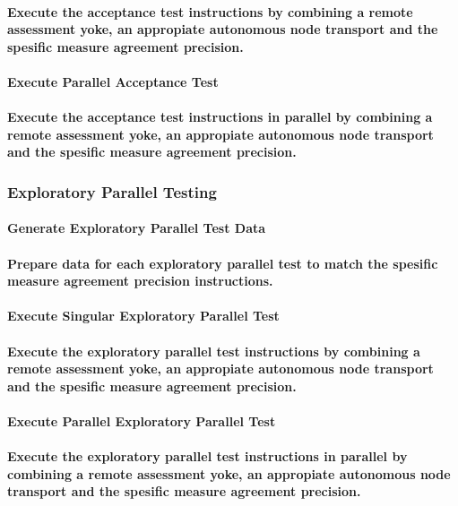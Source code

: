 \documentclass{acm_proc_article-sp}
\begin{document}
\paragraph{Execute the acceptance test instructions by combining a remote assessment yoke, an appropiate autonomous node transport and the spesific measure agreement precision.}
\paragraph{Execute Parallel Acceptance Test}
\paragraph{Execute the acceptance test instructions in parallel by combining a remote assessment yoke, an appropiate autonomous node transport and the spesific measure agreement precision.}
\subsubsection{Exploratory Parallel Testing}
\paragraph{Generate Exploratory Parallel Test Data}
\paragraph{Prepare data for each exploratory parallel test to match the spesific measure agreement precision instructions.}
\paragraph{Execute Singular Exploratory Parallel Test}
\paragraph{Execute the exploratory parallel test instructions by combining a remote assessment yoke, an appropiate autonomous node transport and the spesific measure agreement precision.}
\paragraph{Execute Parallel Exploratory Parallel Test}
\paragraph{Execute the exploratory parallel test instructions in parallel by combining a remote assessment yoke, an appropiate autonomous node transport and the spesific measure agreement precision.}
\end{document}
